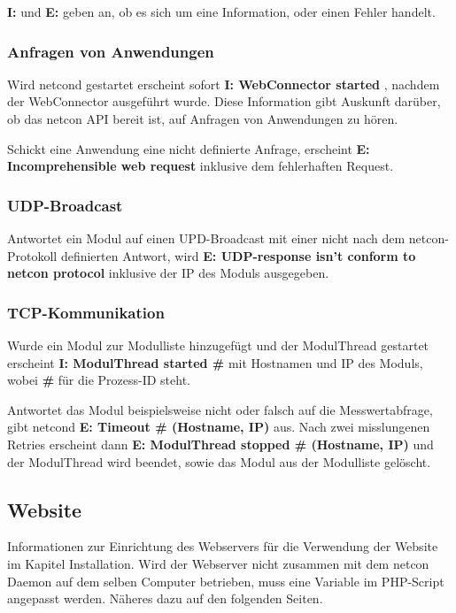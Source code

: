 \documentclass[a4paper,14pt,headsepline]{scrartcl}
\begin{document}
\textbf{I:} und \textbf{E:} geben an, ob es sich um eine Information, oder einen Fehler handelt. 

\newpage
\subsubsection*{Anfragen von Anwendungen}

Wird netcond gestartet erscheint sofort \textbf{I: WebConnector started} , nachdem der WebConnector ausgeführt wurde. Diese Information gibt Auskunft darüber, ob das netcon API bereit ist, auf Anfragen von Anwendungen zu hören. 

Schickt eine Anwendung eine nicht definierte Anfrage, erscheint \textbf{E: Incomprehensible web request} inklusive dem fehlerhaften Request.

\subsubsection*{UDP-Broadcast}
Antwortet ein Modul auf einen UPD-Broadcast mit einer nicht nach dem netcon-Protokoll definierten Antwort, wird  \textbf{E: UDP-response isn’t conform to netcon protocol} inklusive der IP des Moduls ausgegeben.

\subsubsection*{TCP-Kommunikation}
Wurde ein Modul zur Modulliste hinzugefügt und der ModulThread gestartet erscheint \textbf{I: ModulThread started \#} mit Hostnamen und IP des Moduls, wobei \textbf{\#} für die Prozess-ID steht.

Antwortet das Modul beispielsweise nicht oder falsch auf die Messwertabfrage, gibt netcond \textbf{E: Timeout \# (Hostname, IP)} aus. Nach zwei misslungenen Retries erscheint dann \textbf{E: ModulThread stopped \# (Hostname, IP)} und der ModulThread wird beendet, sowie das Modul aus der Modulliste gelöscht. 

\newpage

\subsection{Website}
Informationen zur Einrichtung des Webservers für die Verwendung der Website im Kapitel Installation. Wird der Webserver nicht zusammen mit dem netcon Daemon auf dem selben Computer betrieben, muss eine Variable im PHP-Script angepasst werden. Näheres dazu auf den folgenden Seiten. 
\end{document}
